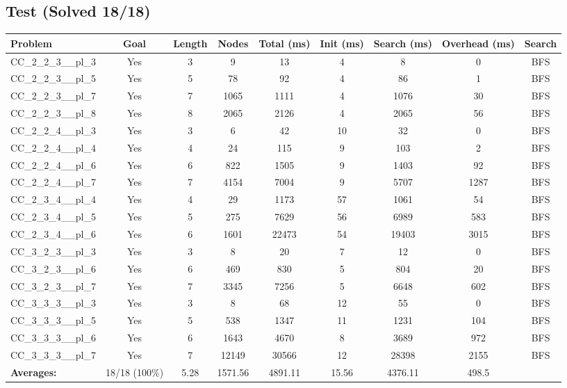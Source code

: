 \documentclass{article}
\begin{document}
\subsection*{Test (Solved 18/18)}
\begin{tabular}{lcccccccc}
\toprule
Problem & Goal & Length & Nodes & Total (ms) & Init (ms) & Search (ms) & Overhead (ms) & Search \\
\midrule
CC\_2\_2\_3\_\_pl\_3 & Yes & 3 & 9 & 13 & 4 & 8 & 0 & BFS \\
CC\_2\_2\_3\_\_pl\_5 & Yes & 5 & 78 & 92 & 4 & 86 & 1 & BFS \\
CC\_2\_2\_3\_\_pl\_7 & Yes & 7 & 1065 & 1111 & 4 & 1076 & 30 & BFS \\
CC\_2\_2\_3\_\_pl\_8 & Yes & 8 & 2065 & 2126 & 4 & 2065 & 56 & BFS \\
CC\_2\_2\_4\_\_pl\_3 & Yes & 3 & 6 & 42 & 10 & 32 & 0 & BFS \\
CC\_2\_2\_4\_\_pl\_4 & Yes & 4 & 24 & 115 & 9 & 103 & 2 & BFS \\
CC\_2\_2\_4\_\_pl\_6 & Yes & 6 & 822 & 1505 & 9 & 1403 & 92 & BFS \\
CC\_2\_2\_4\_\_pl\_7 & Yes & 7 & 4154 & 7004 & 9 & 5707 & 1287 & BFS \\
CC\_2\_3\_4\_\_pl\_4 & Yes & 4 & 29 & 1173 & 57 & 1061 & 54 & BFS \\
CC\_2\_3\_4\_\_pl\_5 & Yes & 5 & 275 & 7629 & 56 & 6989 & 583 & BFS \\
CC\_2\_3\_4\_\_pl\_6 & Yes & 6 & 1601 & 22473 & 54 & 19403 & 3015 & BFS \\
CC\_3\_2\_3\_\_pl\_3 & Yes & 3 & 8 & 20 & 7 & 12 & 0 & BFS \\
CC\_3\_2\_3\_\_pl\_6 & Yes & 6 & 469 & 830 & 5 & 804 & 20 & BFS \\
CC\_3\_2\_3\_\_pl\_7 & Yes & 7 & 3345 & 7256 & 5 & 6648 & 602 & BFS \\
CC\_3\_3\_3\_\_pl\_3 & Yes & 3 & 8 & 68 & 12 & 55 & 0 & BFS \\
CC\_3\_3\_3\_\_pl\_5 & Yes & 5 & 538 & 1347 & 11 & 1231 & 104 & BFS \\
CC\_3\_3\_3\_\_pl\_6 & Yes & 6 & 1643 & 4670 & 8 & 3689 & 972 & BFS \\
CC\_3\_3\_3\_\_pl\_7 & Yes & 7 & 12149 & 30566 & 12 & 28398 & 2155 & BFS \\
\textbf{Averages:} & 18/18 (100\%) & 5.28 & 1571.56 & 4891.11 & 15.56 & 4376.11 & 498.5 & \\
\bottomrule
\end{tabular}
\\[0.7cm]
\end{document}

